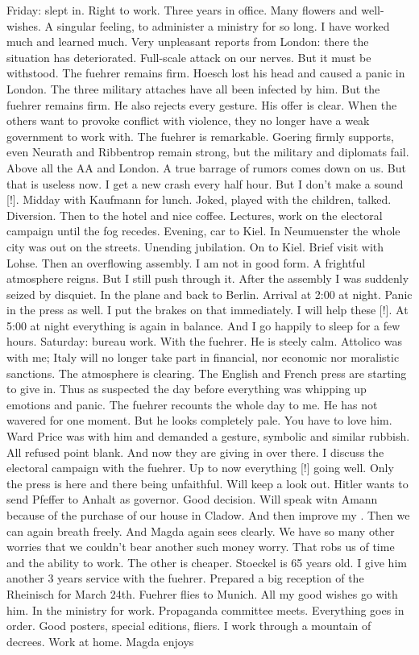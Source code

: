 Friday: slept in. Right to work. Three years in office. Many flowers and well-wishes. A singular feeling, to administer a ministry for so long. I have worked much and learned much. Very unpleasant reports from London: there the situation has deteriorated. Full-scale attack on our nerves. But it must be withstood. The fuehrer remains firm. Hoesch lost his head and caused a panic in London. The three military attaches have all been infected by him. But the fuehrer remains firm. He also rejects every gesture. His offer is clear.   When the others want to provoke conflict with violence, they no longer have a weak government to work with. The fuehrer is remarkable. Goering firmly supports, even Neurath and Ribbentrop remain strong, but the military and diplomats fail. Above all the AA and London. A true barrage of rumors comes down on us. But that is useless now. I get a new crash every half hour. But I don't make a sound [!]. Midday with Kaufmann for lunch.  Joked, played with the children, talked. Diversion. Then to the hotel and nice coffee. Lectures, work on the electoral campaign until the fog recedes. Evening, car to Kiel. In Neumuenster the whole city was out on the streets. Unending jubilation. On to Kiel. Brief visit with Lohse. Then an overflowing assembly. I am not in good form.  A frightful atmosphere reigns. But I still push through it. After the assembly I was suddenly seized by disquiet. In the plane and back to Berlin. Arrival at 2:00 at night. Panic in the press as well. I put the brakes on that immediately. I will help these [!]. At 5:00 at night everything is again in balance. And I go happily to sleep for a few hours. Saturday: bureau work. With the fuehrer. He is steely calm. Attolico was with me; Italy will no longer take part in financial, nor economic nor moralistic sanctions. The atmosphere is clearing. The English and French press are starting to give in. Thus as suspected the day before everything was whipping up emotions and panic. The fuehrer recounts the whole day to me. He has not wavered for one moment. But he looks completely pale. You have to love him. Ward Price was with him and demanded a gesture, symbolic  and similar rubbish. All refused point blank. And now they are giving in over there. I discuss the electoral campaign with the fuehrer. Up to now everything [!] going well. Only the press is here and there being unfaithful. Will keep a look out. Hitler wants to send Pfeffer to Anhalt as governor. Good decision. Will speak witn Amann because of the purchase of our house in Cladow. And then improve my . Then we can again breath freely. And Magda again sees clearly. We have so many other worries that we couldn't bear another such money worry. That robs us of time and the ability to work. The other is cheaper. Stoeckel is 65 years old. I give him another 3 years service with the fuehrer. Prepared a big reception of the Rheinisch  for March 24th. Fuehrer flies to Munich. All my good wishes go with him. In the ministry for work. Propaganda committee meets. Everything goes in order. Good posters, special editions, fliers. I work through a mountain of decrees. Work at home. Magda enjoys 